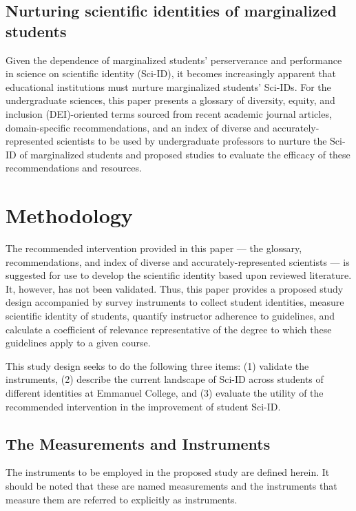 \documentclass[10pt, twocolumn]{article}
\begin{document}
    \subsection{Nurturing scientific identities of marginalized students}
        
        Given the dependence of marginalized students' perserverance and performance in science on scientific identity (Sci-ID), it becomes increasingly apparent that educational institutions must nurture marginalized students' Sci-IDs. For the undergraduate sciences, this paper presents a glossary of diversity, equity, and inclusion (DEI)-oriented terms sourced from recent academic journal articles, domain-specific recommendations, and an index of diverse and accurately-represented scientists to be used by undergraduate professors to nurture the Sci-ID of marginalized students and proposed studies to evaluate the efficacy of these recommendations and resources. 

\section{Methodology}
        
    The recommended intervention provided in this paper --- the glossary, recommendations, and index of diverse and accurately-represented scientists --- is suggested for use to develop the scientific identity based upon reviewed literature. It, however, has not been validated. Thus, this paper provides a proposed study design accompanied by survey instruments to collect student identities, measure scientific identity of students, quantify instructor adherence to guidelines, and calculate a coefficient of relevance representative of the degree to which these guidelines apply to a given course.

    This study design seeks to do the following three items: (1) validate the instruments, (2) describe the current landscape of Sci-ID across students of different identities at Emmanuel College, and (3) evaluate the utility of the recommended intervention in the improvement of student Sci-ID. 

    \subsection{The Measurements and Instruments}

        The instruments to be employed in the proposed study are defined herein. It should be noted that these are named measurements and the instruments that measure them are referred to explicitly as instruments.
\end{document}
